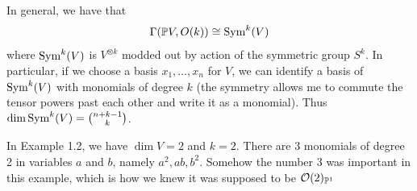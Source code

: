 \documentclass[12pt]{article}
\begin{document}
\begin{fact}
In general, we have that \begin{align*}
    \Gamma(\mathbb{P} V,O(k))\cong\operatorname{Sym}^k(V)
\end{align*} where $\operatorname{Sym}^k(V)$ is $V^{\otimes k}$ modded out by action of the symmetric group $S^k$. In particular, if we choose a basis $x_1,\dots,x_n$ for $V$, we can identify a basis of $\operatorname{Sym}^k(V)$ with monomials of degree $k$ (the symmetry allows me to commute the tensor powers past each other and write it as a monomial). Thus $\dim\operatorname{Sym}^k(V) = \binom{n+k-1}{k}$.
\end{fact}

\begin{example}
In Example 1.2, we have $\dim V = 2$ and $k = 2$. There are 3 monomials of degree 2 in variables $a$ and $b$, namely $a^2,ab,b^2$. Somehow the number 3 was important in this example, which is how we knew it was supposed to be $\mathcal{O}(2)_{\mathbb{P}^1}$
\end{example}
\end{document}
